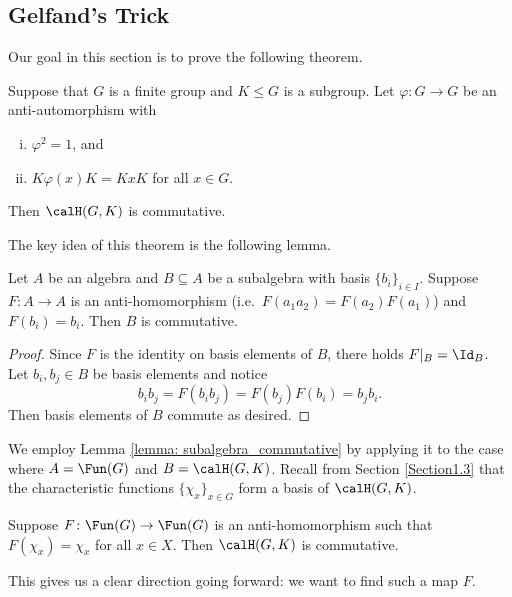 \subsection{Gelfand's Trick}\label{Section1.7}
Our goal in this section is to prove the following theorem.
\begin{thm} \label{theorem: Gelfand's_Trick}
	Suppose that $G$ is a finite group and $K\leq G$ is a subgroup.
	Let $\varphi\colon G\to G$ be an anti-automorphism with
	\begin{enumerate}[(i)]
		\item $\varphi^2=1$, and
		\item $K\varphi(x)K=KxK$ for all $x\in G$.
	\end{enumerate}
	Then $\calH(G,K)$ is commutative.
\end{thm}
The key idea of this theorem is the following lemma.
\begin{lem}\label{lemma: subalgebra_commutative}
	Let $A$ be an algebra and $B\subseteq A$ be a subalgebra with basis $\{b_i\}_{i\in I}$.
	Suppose $F\colon A\to A$ is an anti-homomorphism (i.e.\ $F(a_1a_2)=F(a_2)F(a_1)$) and $F(b_i) = b_i$.
	Then $B$ is commutative.
\end{lem}
\begin{proof}
	Since $F$ is the identity on basis elements of $B$, there holds $F|_B = \Id_B$.
	Let $b_i,b_j\in B$ be basis elements and notice
	\[
		b_ib_j = F(b_ib_j) = F(b_j)F(b_i) = b_jb_i.
	\]
	Then basis elements of $B$ commute as desired.
\end{proof}
We employ Lemma \ref{lemma: subalgebra_commutative} by applying it to the case where $A=\Fun(G)$ and $B=\calH(G,K)$. Recall from Section \ref{Section1.3} that the characteristic functions $\{\chi_x\}_{x\in G}$ form a basis of $\calH(G,K)$.
\begin{cor}\label{cor: comm}
	Suppose $F\colon \Fun(G) \to \Fun(G)$ is an anti-homomorphism such that $F(\chi_x) = \chi_x$ for all $x\in X$.
	Then $\calH(G,K)$ is commutative.
\end{cor}
This gives us a clear direction going forward: we want to find such a map $F$.


